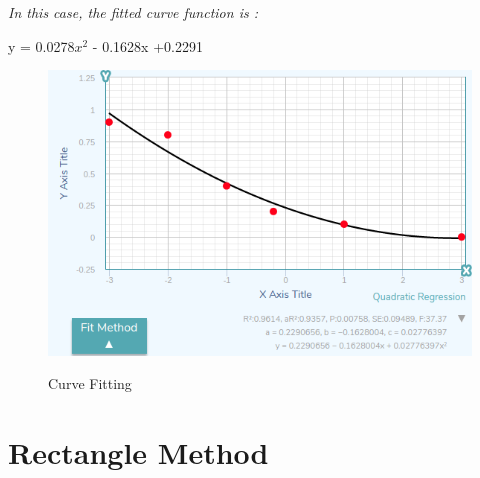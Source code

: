 \emph{\color{blue}In this case, the fitted curve function is :} \vfill 
\begin{center}
y = 0.0278$x^{2} $ - 0.1628x +0.2291
\end{center}

\begin{figure}[H]
 \centering
  \includegraphics[width=1\textwidth]{./Bilder/Curve_Fitting.png}\label{Curve_Fitting}
  \caption{Curve Fitting\cite{Curve_Fitting_Plot}}
\end{figure}



\section{Rectangle Method}\label{sec:Rectangle Method}


%




